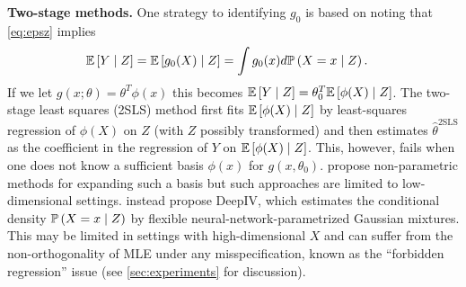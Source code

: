 \documentclass{article}
\theoremstyle{plain}
\theoremstyle{definition}
\begin{document}
{\bf Two-stage methods.} 
One strategy to identifying $g_0$ is based on noting
that \cref{eq:epsz} implies
\begin{align}\label{eq:2sls}
\Eb{Y\mid Z}&=\Eb{g_0(X)\mid Z}=\int g_0(x)d\Prb{X=x\mid Z}.
%
%
\end{align}
If we let $g(x;\theta)=\theta^T\phi(x)$ this becomes $\mathbb{E}\left[{Y\mid Z}\right]=\theta_0^T\mathbb{E}\left[{\phi(X)\mid Z}\right]$. The two-stage least squares (2SLS) method \citep[\S4.1.1]{angrist2008mostly} first fits $\mathbb{E}\left[{\phi(X)\mid Z}\right]$ by least-squares regression of $\phi(X)$ on $Z$ (with $Z$ possibly transformed) and then estimates $\hat\theta^\text{2SLS}$ as the coefficient in the regression of $Y$ on $\mathbb{E}\left[{\phi(X)\mid Z}\right]$.
This, however, fails when one does not know a sufficient basis $\phi(x)$ for $g(x,\theta_0)$.
\citep{newey2003instrumental,darolles2011nonparametric} propose non-parametric methods for expanding such a basis but such approaches are limited to low-dimensional settings.
\citep{hartford2017deep} instead propose DeepIV, which estimates the conditional density $\mathbb{P}\left(X=x\mid Z\right)$ by flexible neural-network-parametrized Gaussian mixtures. This may be limited in settings with high-dimensional $X$ and can suffer from the non-orthogonality of MLE under any misspecification, known as the ``forbidden regression'' issue 
%
\citep[\S4.6.1]{angrist2008mostly}
(see \cref{sec:experiments} for discussion).
%

%
\end{document}
